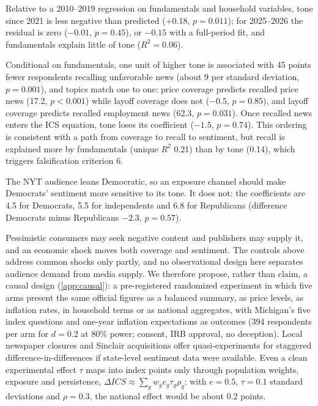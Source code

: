 \documentclass[11pt]{article}
\begin{document}
 Relative to a 2010–2019 regression on fundamentals and household variables, tone since 2021 is less negative than predicted (+0.18, $p = 0.011$); for 2025–2026 the residual is zero ($-0.01$, $p = 0.45$), or $-0.15$ with a full-period fit, and fundamentals explain little of tone ($R^2 = 0.06$).

 Conditional on fundamentals, one unit of higher tone is associated with 45 points fewer respondents recalling unfavorable news (about 9 per standard deviation, $p = 0.001$), and topics match one to one: price coverage predicts recalled price news (17.2, $p < 0.001$) while layoff coverage does not ($-0.5$, $p = 0.85$), and layoff coverage predicts recalled employment news (62.3, $p = 0.031$). Once recalled news enters the ICS equation, tone loses its coefficient ($-1.5$, $p = 0.74$). This ordering is consistent with a path from coverage to recall to sentiment, but recall is explained more by fundamentals (unique $R^2$ 0.21) than by tone (0.14), which triggers falsification criterion 6.

 The NYT audience leans Democratic, so an exposure channel should make Democrats' sentiment more sensitive to its tone. It does not: the coefficients are 4.5 for Democrats, 5.5 for independents and 6.8 for Republicans (difference Democrats minus Republicans $-2.3$, $p = 0.57$).

 Pessimistic consumers may seek negative content and publishers may supply it, and an economic shock moves both coverage and sentiment. The controls above address common shocks only partly, and no observational design here separates audience demand from media supply. We therefore propose, rather than claim, a causal design (\cref{app:causal}): a pre-registered randomized experiment in which five arms present the same official figures as a balanced summary, as price levels, as inflation rates, in household terms or as national aggregates, with Michigan's five index questions and one-year inflation expectations as outcomes (394 respondents per arm for $d = 0.2$ at 80\% power; consent, IRB approval, no deception). Local newspaper closures and Sinclair acquisitions \citep{martin2019} offer quasi-experiments for staggered difference-in-differences \citep{callaway2021} if state-level sentiment data were available. Even a clean experimental effect $\tau$ maps into index points only through population weights, exposure and persistence, $\Delta \mathit{ICS} \approx \sum_g w_g e_g \tau_g \rho_g$; with $e = 0.5$, $\tau = 0.1$ standard deviations and $\rho = 0.3$, the national effect would be about 0.2 points.
\end{document}
